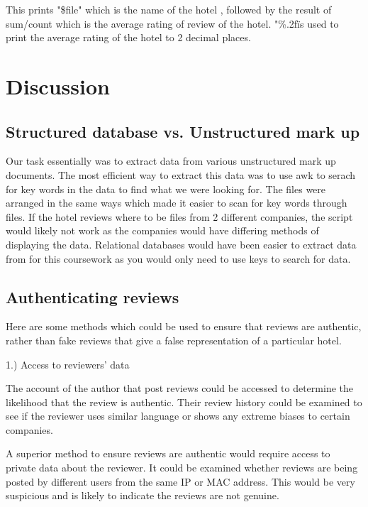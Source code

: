 \documentclass{article}
\begin{document}
This prints "\$file" which is the name of the hotel , followed by
the result of sum/count which is the average rating of review of
the hotel. "\%.2f\" is used to print the average rating of the hotel
to 2 decimal places.



\newpage

\section{Discussion}
\subsection{Structured database vs. Unstructured mark up}

Our task essentially was to extract data from various unstructured mark up documents. The most efficient way to extract this data was to use awk to serach for key words in the data to find what we were looking for. The files were arranged in the same ways which made it easier to scan for key words through files. If the hotel reviews where to be files from 2 different companies, the script would likely not work as the companies would have differing methods of displaying the data. Relational databases would have been easier to extract data from for this coursework as you would only need to use keys to search for data.

\subsection{Authenticating reviews}

Here are some methods which could be used to ensure that reviews are authentic, rather than fake reviews that give a false representation of a particular hotel.
\newline

1.) Access to reviewers' data
\newline

The account of the author that post reviews could be accessed to determine the likelihood that the review is authentic. Their review history could be examined to see if the reviewer uses similar language or shows any extreme biases to certain companies.

A superior method to ensure reviews are authentic would require access to private data about the reviewer. It could be examined whether reviews are being posted by different users from the same IP or MAC address. This would be very suspicious and is likely to indicate the reviews are not genuine.
\newline
\end{document}
